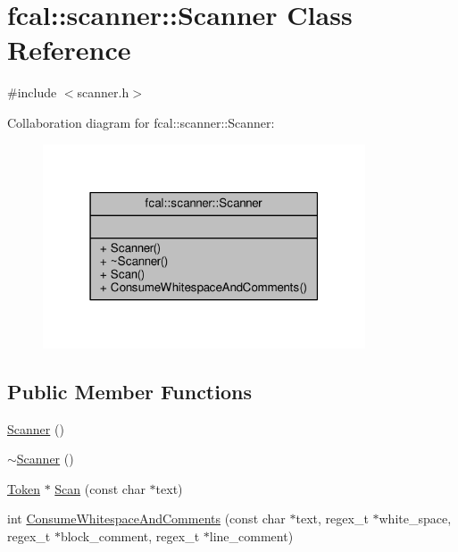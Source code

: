 \hypertarget{classfcal_1_1scanner_1_1Scanner}{}\section{fcal\+:\+:scanner\+:\+:Scanner Class Reference}
\label{classfcal_1_1scanner_1_1Scanner}


{\ttfamily \#include $<$scanner.\+h$>$}



Collaboration diagram for fcal\+:\+:scanner\+:\+:Scanner\+:
\nopagebreak
\begin{figure}[H]
\begin{center}
\leavevmode
\includegraphics[width=271pt]{classfcal_1_1scanner_1_1Scanner__coll__graph}
\end{center}
\end{figure}
\subsection*{Public Member Functions}
\begin{DoxyCompactItemize}
\item 
\hyperlink{classfcal_1_1scanner_1_1Scanner_a606874481764d7a73f55364a32f09e56}{Scanner} ()
\item 
\hyperlink{classfcal_1_1scanner_1_1Scanner_a7a35882ef749209bce3146916e3a8aec}{$\sim$\+Scanner} ()
\item 
\hyperlink{classfcal_1_1scanner_1_1Token}{Token} $\ast$ \hyperlink{classfcal_1_1scanner_1_1Scanner_afe81aba5714ee2132baaf9546b08dc87}{Scan} (const char $\ast$text)
\item 
int \hyperlink{classfcal_1_1scanner_1_1Scanner_a873b7e7988d420ce9d5b28b237d4ad54}{Consume\+Whitespace\+And\+Comments} (const char $\ast$text, regex\+\_\+t $\ast$white\+\_\+space, regex\+\_\+t $\ast$block\+\_\+comment, regex\+\_\+t $\ast$line\+\_\+comment)
\end{DoxyCompactItemize}


